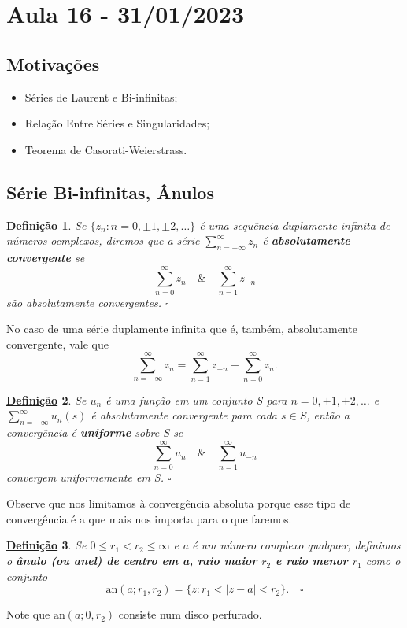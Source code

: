 \documentclass{article}
\newtheorem*{def*}{\underline{Defini\c c\~ao}}
\begin{document}
  \section{Aula 16 - 31/01/2023}
  \subsection{Motivações}
  \begin{itemize}
    \item Séries de Laurent e Bi-infinitas;
    \item Relação Entre Séries e Singularidades;
    \item Teorema de Casorati-Weierstrass.
  \end{itemize}
  \subsection{Série Bi-infinitas, Ânulos}
  \begin{def*}
    Se \(\{z_{n}:n = 0, \pm1, \pm2, \dotsc \}\) é uma sequência duplamente infinita de números ocmplexos, diremos
    que a série \(\sum\limits_{n=-\infty}^{\infty}z_{n}\) é \textbf{absolutamente convergente} se 
    \[
      \sum\limits_{n=0}^{\infty}z_{n}\quad\&\quad \sum\limits_{n=1}^{\infty}z_{-n}
    \]
    são absolutamente convergentes. \(\square\) 
  \end{def*}
  No caso de uma série duplamente infinita que é, também, absolutamente convergente, vale que 
  \[
    \sum\limits_{n=-\infty}^{\infty}z_{n} = \sum\limits_{n=1}^{\infty}z_{-n} + \sum\limits_{n=0}^{\infty}z_{n}.
  \]
  \begin{def*}
    Se \(u_{n}\) é uma função em um conjunto S para \(n=0, \pm1, \pm2, \dotsc \) e \( \sum\limits_{n=-\infty}^{\infty}u_{n}(s)\) é absolutamente convergente 
    para cada \(s\in S\), então a convergência é \textbf{uniforme} sobre S se 
    \[
      \sum\limits_{n=0}^{\infty}u_{n}\quad\&\quad \sum\limits_{n=1}^{\infty}u_{-n}
    \]
    convergem uniformemente em S. \(\square\)
  \end{def*}
  Observe que nos limitamos à convergência absoluta porque esse tipo de convergência é a que mais nos importa
  para o que faremos.
  \begin{def*}
    Se \(0\leq r_{1}<r_{2}\leq \infty\) e a é um número complexo qualquer, definimos 
    o \textbf{ânulo (ou anel) de centro em a, raio maior \(r_{2}\) e raio menor \(r_{1}\)} como o conjunto
    \[
      \mathrm{an}(a; r_{1}, r_{2}) = \{z: r_{1} < |z-a| < r_{2}\}.\quad \square
    \]
  \end{def*}
  Note que \(\mathrm{an}(a; 0, r_{2})\) consiste num disco perfurado.
\end{document}
